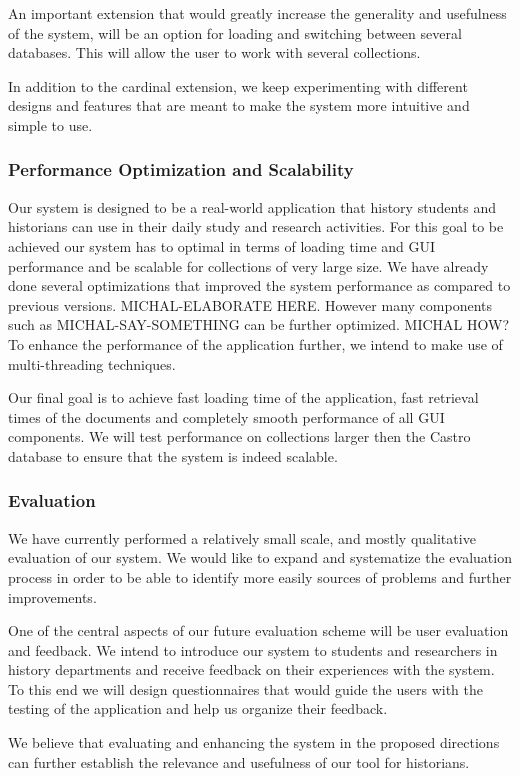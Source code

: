 An important extension that would greatly increase the generality and usefulness of the system, 
will be an option for loading and switching between several databases. This will allow the user to work with several collections.

In addition to the cardinal extension, we keep experimenting with different designs and features that are meant to make the
system more intuitive and simple to use. 

\subsubsection{Performance Optimization and Scalability}
Our system is designed to be a real-world application that history students and historians can use in their daily study and research activities.
For this goal to be achieved our system has to optimal in terms of loading time and GUI performance and be scalable for collections 
of very large size. We have already done several optimizations that improved the system performance as compared to
previous versions. MICHAL-ELABORATE HERE. However many components such as MICHAL-SAY-SOMETHING can be further optimized. MICHAL HOW? 
To enhance the performance of the application further, we intend to make use of multi-threading techniques. 

Our final goal is to achieve fast loading time of the application, fast retrieval times of the documents and completely 
smooth performance of all GUI components. We will test performance on collections larger then the Castro database to ensure
that the system is indeed scalable.    

\subsubsection{Evaluation}

We have currently performed a relatively small scale, and mostly qualitative evaluation of our system. We would like to 
expand and systematize the evaluation process in order to be able to identify more easily sources of problems and further improvements.

One of the central aspects of our future evaluation scheme will be user evaluation and feedback. We intend to introduce our system
to students and researchers in history departments and receive feedback on their experiences with the system.
To this end we will design questionnaires that would guide the users with the testing of the application and help us organize their feedback.
 
We believe that evaluating and enhancing the system in the proposed directions can further establish the relevance and usefulness 
of our tool for historians.  

